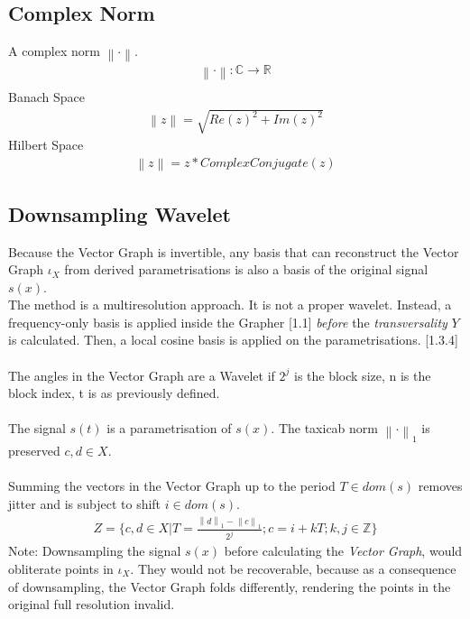 \documentclass{report}
\newcommand\norm[1]{\left\lVert#1\right\rVert}
\begin{document}
\subsection*{Complex Norm}
A complex norm $\norm{\cdot}$.
\begin{align}
\norm{\cdot} : \mathbb{C} \rightarrow \mathbb{R}\\
\end{align}
Banach Space
\begin{align}
\norm{z} = \sqrt{Re(z)^2+Im(z)^2}
\end{align}
Hilbert Space
\begin{align}
\norm{z} = z*ComplexConjugate(z)
\end{align}

\subsection{Downsampling Wavelet}
Because the Vector Graph is invertible, any basis that can reconstruct the Vector Graph $\iota_{X}$ from derived parametrisations is also a basis of the original signal $s(x)$.\\
The method is a multiresolution approach. It is not a proper wavelet. Instead, a frequency-only basis is applied inside the Grapher \cite{Grapher}[1.1] \emph{before} the \emph{transversality} $Y$ is calculated. Then, a local cosine basis is applied on the parametrisations. \cite{Mallat}[1.3.4]\\\\
The angles in the Vector Graph are a Wavelet if $2^j$ is the block size, n is the block index, t is as previously defined.\\\\
The signal $s(t)$ is a parametrisation of $s(x)$. The taxicab norm $\norm{\cdot}_{1}$ is preserved $c,d \in X$.\\\\
Summing the vectors in the Vector Graph up to the period $T \in dom(s)$ removes jitter and is subject to shift $i \in dom(s)$.
\begin{align}
Z = \{c,d \in X \vert T=\frac{\norm{d}_1-\norm{c}_1}{2^j};c=i+kT;k,j \in \mathbb{Z}\}
\end{align}
Note: Downsampling the signal $s(x)$ before calculating the \emph{Vector Graph}, would obliterate points in $\iota_{X}$. They would not be recoverable, because as a consequence of downsampling, the Vector Graph folds differently, rendering the points in the original full resolution invalid.\\\\
\end{document}

